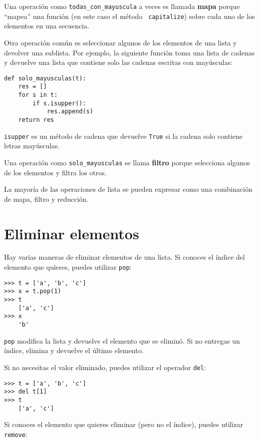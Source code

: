 \documentclass[10pt]{book}
\begin{document}
Una operación como \verb"todas_con_mayuscula" a veces es llamada {\bf
mapa} porque ``mapea'' una función (en este caso el método {\tt
capitalize}) sobre cada uno de los elementos en una secuencia.

Otra operación común es seleccionar algunos de los elementos de
una lista y devolver una sublista.  Por ejemplo, la siguiente
función toma una lista de cadenas y devuelve una lista que contiene
solo las cadenas escritas con mayúsculas:

\begin{verbatim}
def solo_mayusculas(t):
    res = []
    for s in t:
        if s.isupper():
            res.append(s)
    return res
\end{verbatim}
%
{\tt isupper} es un método de cadena que devuelve {\tt True} si
la cadena solo contiene letras mayúsculas.

Una operación como \verb"solo_mayusculas" se llama {\bf filtro} porque
selecciona algunos de los elementos y filtra los otros.

La mayoría de las operaciones de lista se pueden expresar como una combinación
de mapa, filtro y reducción.


\section{Eliminar elementos}

Hay varias maneras de eliminar elementos de una lista.  Si conoces
el índice del elemento que quieres, puedes utilizar
{\tt pop}:

\begin{verbatim}
>>> t = ['a', 'b', 'c']
>>> x = t.pop(1)
>>> t
    ['a', 'c']
>>> x
    'b'
\end{verbatim}
%
{\tt pop} modifica la lista y devuelve el elemento que se eliminó.
Si no entregas un índice, elimina y devuelve el
último elemento.

Si no necesitas el valor eliminado, puedes utilizar el
operador {\tt del}:

\begin{verbatim}
>>> t = ['a', 'b', 'c']
>>> del t[1]
>>> t
    ['a', 'c']
\end{verbatim}
%
Si conoces el elemento que quieres eliminar (pero no el índice),
puedes utilizar {\tt remove}:
\end{document}
